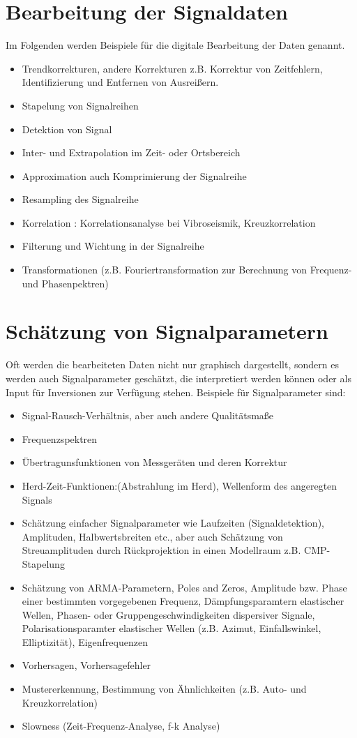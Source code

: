 \section{Bearbeitung der Signaldaten}
Im Folgenden werden Beispiele für die digitale Bearbeitung der Daten genannt.
\begin{itemize}
\item Trendkorrekturen, andere Korrekturen z.B. Korrektur von Zeitfehlern, Identifizierung und Entfernen von Ausreißern. 
\item Stapelung von Signalreihen
\item Detektion von Signal
\item Inter- und Extrapolation im Zeit- oder Ortsbereich
\item Approximation auch Komprimierung der Signalreihe
\item Resampling des Signalreihe
\item Korrelation : Korrelationsanalyse bei Vibroseismik, Kreuzkorrelation
\item Filterung und Wichtung in der Signalreihe
\item Transformationen (z.B. Fouriertransformation zur Berechnung von Frequenz- und Phasenpektren)
\end{itemize}

\section{Schätzung von Signalparametern}
Oft werden die bearbeiteten Daten nicht nur graphisch dargestellt, sondern es werden auch Signalparameter geschätzt, die interpretiert werden können oder als Input für Inversionen zur Verfügung stehen. Beispiele für Signalparameter sind:
\begin{itemize}
\item Signal-Rausch-Verhältnis, aber auch andere Qualitätsmaße
\item Frequenzspektren
\item Übertragunsfunktionen von Messgeräten und deren Korrektur
\item Herd-Zeit-Funktionen:(Abstrahlung im Herd), Wellenform des angeregten Signals
\item Schätzung einfacher Signalparameter wie Laufzeiten (Signaldetektion), Amplituden, Halbwertsbreiten etc., aber auch Schätzung von Streuamplituden durch Rückprojektion in einen Modellraum z.B. CMP-Stapelung
\item Schätzung von ARMA-Parametern, Poles and Zeros, Amplitude bzw. Phase einer bestimmten vorgegebenen Frequenz, Dämpfungsparamtern elastischer Wellen, Phasen- oder Gruppengeschwindigkeiten dispersiver Signale, Polarisationsparamter elastischer Wellen (z.B. Azimut, Einfallswinkel, Elliptizität), Eigenfrequenzen
\item Vorhersagen, Vorhersagefehler
\item Mustererkennung, Bestimmung von Ähnlichkeiten (z.B. Auto- und Kreuzkorrelation)
\item Slowness (Zeit-Frequenz-Analyse, f-k Analyse)
  \end{itemize}


